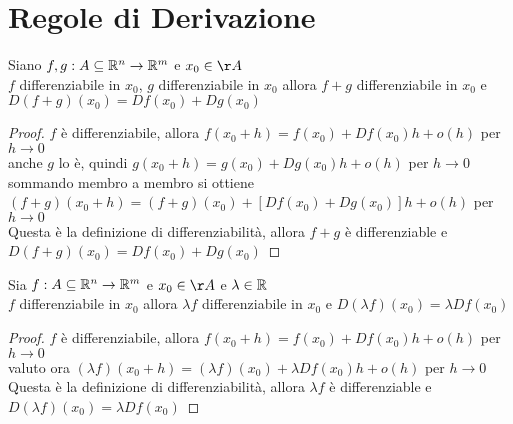 \section{Regole di Derivazione}
\proposition
Siano $f,g: A\subseteq \mathbb{R}^n \rightarrow \mathbb{R}^m$ e $x_0\in\AA$\\
$f$ differenziabile in $x_0$, $g$ differenziabile in $x_0$ allora $f+g$ differenziabile in $x_0$ e $D(f+g)(x_0) = Df(x_0)+Dg(x_0)$
\begin{proof}
	$f$ è differenziabile, allora $f(x_0+h)=f(x_0)+Df(x_0)h+o(h)$ per $h\rightarrow 0$\\
	anche $g$ lo è, quindi $g(x_0+h)=g(x_0)+Dg(x_0)h+o(h)$ per $h\rightarrow 0$\\
	sommando membro a membro si ottiene  $(f+g)(x_0+h)=(f+g)(x_0)+[Df(x_0)+Dg(x_0)]h+o(h)$ per $h\rightarrow 0$\\
	Questa è la definizione di differenziabilità, allora $f+g$ è differenziable e $D(f+g)(x_0) = Df(x_0)+Dg(x_0)$
\end{proof}

\proposition
Sia $f: A\subseteq \mathbb{R}^n \rightarrow \mathbb{R}^m$ e $x_0\in\AA$ e $\lambda\in \mathbb{R}$\\
$f$ differenziabile in $x_0$ allora $\lambda f$ differenziabile in $x_0$ e $D(\lambda f)(x_0) = \lambda Df(x_0)$
\begin{proof}
	$f$ è differenziabile, allora $f(x_0+h)=f(x_0)+Df(x_0)h+o(h)$ per $h\rightarrow 0$\\
	valuto ora $(\lambda f)(x_0+h)=(\lambda f)(x_0)+\lambda Df(x_0)h+o(h)$ per $h\rightarrow 0$\\
	Questa è la definizione di differenziabilità, allora $\lambda f$ è differenziable e $D(\lambda f)(x_0) = \lambda Df(x_0)$
\end{proof}

